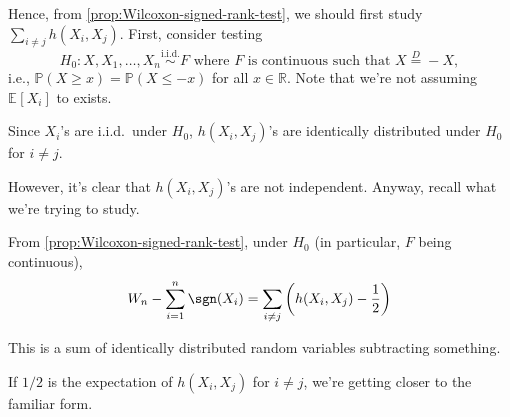 Hence, from \autoref{prop:Wilcoxon-signed-rank-test}, we should first study \(\sum_{i \neq j} h(X_i, X_j)\). First, consider testing
\[
	H_0 \colon X, X_1, \dots , X_n \overset{\text{i.i.d.} }{\sim } F \text{ where \(F\) is continuous such that } X \overset{D}{=} -X,
\]
i.e., \(\mathbb{P} (X \geq x) = \mathbb{P} (X \leq -x)\) for all \(x \in \mathbb{R}\). Note that we're not assuming \(\mathbb{E}_{}[X_i] \) to exists.

\begin{note}
	Since \(X_i\)'s are i.i.d.\ under \(H_0\), \(h(X_i, X_j)\)'s are identically distributed under \(H_0\) for \(i \neq j\).
\end{note}

However, it's clear that \(h(X_i, X_j)\)'s are not independent. Anyway, recall what we're trying to study.

\begin{prev}
	From \autoref{prop:Wilcoxon-signed-rank-test}, under \(H_0\) (in particular, \(F\) being continuous),
	\[
		W_n - \sum_{i=1}^{n} \sgn (X_i)
		= \sum_{i \neq j} \left( h(X_i , X_j) - \frac{1}{2} \right)
	\]
\end{prev}
This is a sum of identically distributed random variables subtracting something.

\begin{intuition}
	If \(1 / 2\) is the expectation of \(h(X_i, X_j)\) for \(i \neq j\), we're getting closer to the familiar form.
\end{intuition}

